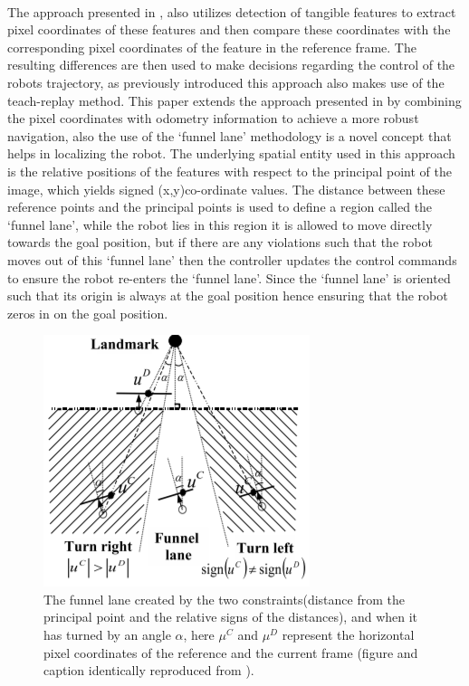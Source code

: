 	\paragraph{}The approach presented in \cite{chen2009qualitative}, also utilizes detection of tangible features to extract pixel coordinates of these features and then compare these coordinates with the corresponding pixel coordinates of the feature in the reference frame. The resulting differences are then used to make decisions regarding the control of the robots trajectory, as previously introduced this approach also makes use of the teach-replay method. This paper extends the approach presented in \cite{chen2006qualitative} by combining the pixel coordinates with odometry information to achieve a more robust navigation, also the use of the `funnel lane' methodology is a novel concept that helps in localizing the robot. The underlying spatial entity used in this approach is the relative positions of the features with respect to the principal point of the image, which yields signed (x,y)co-ordinate values. The distance between these reference points and the principal points is used to define a region called the `funnel lane', while the robot lies in this region it is allowed to move directly towards the goal position, but if there are any violations such that the robot moves out of this `funnel lane' then the controller updates the control commands to ensure the robot re-enters the `funnel lane'. Since the `funnel lane' is oriented such that its origin is always at the goal position hence ensuring that the robot zeros in on the goal position.
	\begin{figure}[h]
		\centering
		\includegraphics[scale=1]{images/funnel_lane}
		\caption{The funnel lane created by the two constraints(distance from the principal point and the relative signs of the distances), and when it has turned by an angle $\alpha$, here $\mu^C$  and  $\mu^D$ represent the horizontal pixel coordinates of the reference and the current frame (figure and caption identically reproduced from \cite{chen2006qualitative}).}
		\label{fig:funnellane}
	\end{figure}
	
